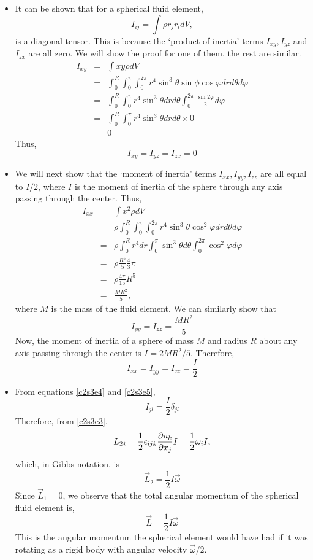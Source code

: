 \begin{itemize}
\item It can be shown that for a spherical fluid element,
\[
I_{ij} = \int \rho r_j r_l dV,
\]
is a diagonal tensor. This is because the \enquote*{product of inertia} terms $I_{xy}, I_{yz}$ and $I_{zx}$ are all zero. We will show the proof for one of them, the rest are similar.
\begin{eqnarray*}
I_{xy} &=& \int xy\rho dV \\
 &=& \int_0^R\int_0^\pi\int_0^{2\pi} r^4\sin^3\theta\sin\phi\cos\varphi dr d\theta d\varphi \\
 &=& \int_0^R\int_0^\pi r^4\sin^3\theta dr d\theta \int_0^{2\pi} \frac{\sin 2\varphi}{2}d\varphi \\
 &=& \int_0^R\int_0^\pi r^4\sin^3\theta dr d\theta \times 0 \\
 &=& 0
\end{eqnarray*}
Thus,
\begin{equation}\label{c2s3e4}
I_{xy} = I_{yz} = I_{zx} = 0
\end{equation}

\item We will next show that the \enquote*{moment of inertia} terms $I_{xx}, I_{yy}, I_{zz}$ are all equal to $I/2$, where $I$ is the moment of inertia of the sphere through any axis 
passing through the center. Thus,
\begin{eqnarray*}
I_{xx} &=& \int x^2 \rho dV \\
 &=& \rho\int_0^R\int_0^\pi\int_0^{2\pi} r^4\sin^3\theta\cos^2\varphi dr d\theta d\varphi \\
 &=& \rho\int_0^R r^4 dr \int_0^\pi \sin^3\theta d\theta \int_0^{2\pi}\cos^2\varphi d\varphi \\
 &=& \rho\frac{R^5}{5} \frac{4}{3} \pi \\
 &=& \rho\frac{4\pi}{15}R^5 \\
 &=& \frac{MR^2}{5},
\end{eqnarray*}
where $M$ is the mass of the fluid element. We can similarly show that 
\[
I_{yy} = I_{zz} = \frac{MR^2}{5}
\]
Now, the moment of inertia of a sphere of mass $M$ and radius $R$ about any axis passing through the center is $I = 2MR^2/5$. Therefore,
\begin{equation}\label{c2s3e5}
I_{xx} = I_{yy} = I_{zz} = \frac{I}{2}
\end{equation}

\item From equations \eqref{c2s3e4} and \eqref{c2s3e5},
\[
I_{jl} = \frac{I}{2}\delta_{jl}
\]
Therefore, from \eqref{c2s3e3},
\[
{L_2}_i = \frac{1}{2}\epsilon_{ijk}\frac{\partial{u_k}}{\partial{x_j}}I = \frac{1}{2}\omega_i I,
\]
which, in Gibbs notation, is
\[
\vec{L}_2 = \frac{1}{2}I\vec{\omega}
\]
Since $\vec{L}_1 = 0$, we observe that the total angular momentum of the spherical fluid element is,
\[
\vec{L} = \frac{1}{2}I\vec{\omega}
\]
This is the angular momentum the spherical element would have had if it was rotating as a rigid body with angular velocity $\vec{\omega}/2$.


\end{itemize}
